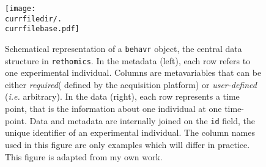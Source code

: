 \begin{figure}[h!]
	\centering   
	\texttt{[image: \\currfiledir/.\\currfilebase.pdf]}
	  \caption[The behavr data structure]{
	Schematical representation of a \texttt{behavr} object, the central data structure in \texttt{rethomics}.
	In the metadata (left), each row refers to one experimental individual. 
	Columns are metavariables that can be either \emph{required}(\ie{} defined by the acquisition platform) or \emph{user-defined} (\emph{i.e.} arbitrary).
	In the data (right), each row represents a time point, that is the information about one individual at one time-point.
	Data and metadata are internally joined on the \texttt{id} field, the unique identifier of an experimental individual.
	The column names used in this figure are only examples which will differ in practice. 
	This figure is adapted from my own work\cite{geissmann_rethomics_2018}.
	\label{fig:\currfilebase}
}
\end{figure}
